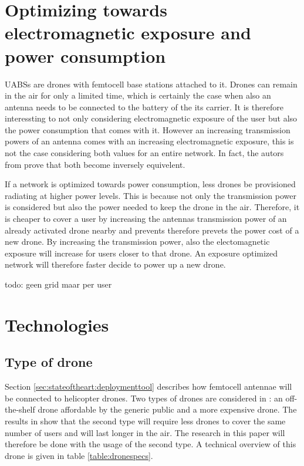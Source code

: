 \section{Optimizing towards electromagnetic exposure and power consumption}
\gls{UABS}s are drones with femtocell base stations attached to it. Drones can remain in the air for only a limited time, which is certainly 
the  case when also an antenna needs to be connected to the battery of the its carrier. It is therefore
interessting to not only considering electromagnetic exposure of the user but also the power consumption that comes with it. 
However an increasing transmission powers of an antenna comes with an increasing electromagnetic exposure, this is not the case considering
both values for an entire network. In fact, the autors from \cite{J1}  prove that both become inversely equivelent.

If a network is optimized towards power consumption, less drones be provisioned radiating at higher power levels. This is because not only 
the transmission power is considered but also the power needed to keep the drone in the air. Therefore, it is cheaper to cover a user by 
increasing the antennas transmission power of an already activated drone nearby and prevents therefore prevets the power cost of a new drone.
By increasing the transmission power, also the electomagnetic exposure will increase for users closer to that drone. An exposure optimized
network will therefore faster decide to power up a new drone.

todo: geen grid maar per user

\section{Technologies}
\subsection{Type of drone}

Section \ref{sec:stateoftheart:deploymenttool} describes how femtocell antennae will be connected to helicopter drones. Two types of 
drones are considered in \cite{J2}: an off-the-shelf drone affordable by the generic public and a more expensive drone. The results in \cite{J2}
show that the second type will require less drones to cover the same number of users and will last longer in the air. The research in this paper
will therefore be done with the usage of the second type. A technical overview of this drone is given in table \ref{table:dronespecs}.

